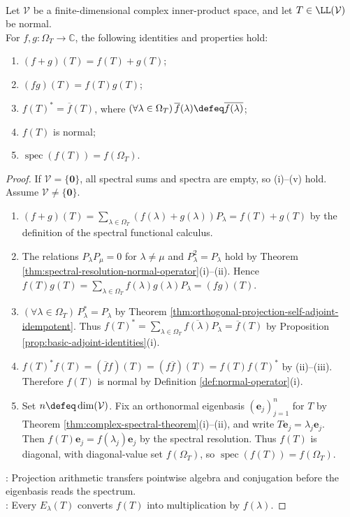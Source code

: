 \begin{theorem} \label{thm:normal-spectral-functional-calculus-rules} \\
Let $\mathcal{V}$ be a finite-dimensional complex inner-product space, and let $T\in\LL(\mathcal{V})$ be normal.\\
For $f,g:\Omega_T\to\mathbb{C}$, the following identities and properties hold:
\begin{enumerate}[label=(\roman*)]
\setlength{\itemsep}{0pt}
\item $(f+g)(T)=f(T)+g(T)$;
\item $(fg)(T)=f(T)g(T)$;
\item $f(T)^*=\overline{f}(T)$, where $(\forall\lambda\in\Omega_T)\,\overline{f}(\lambda)\defeq\overline{f(\lambda)}$;
\item $f(T)$ is normal;
\item $\operatorname{spec}(f(T))=f(\Omega_T)$.
\end{enumerate}
\begin{proof}
If $\mathcal{V}=\{\mathbf{0}\}$, all spectral sums and spectra are empty, so (i)--(v) hold. Assume $\mathcal{V}\neq\{\mathbf{0}\}$.
\begin{enumerate}[label=(\roman*)]
\setlength{\itemsep}{0pt}
\item $(f+g)(T)=\sum\limits_{\lambda\in\Omega_T}(f(\lambda)+g(\lambda))P_{\lambda}=f(T)+g(T)$ by the definition of the spectral functional calculus.
\item The relations $P_{\lambda}P_{\mu}=0$ for $\lambda\neq\mu$ and $P_{\lambda}^2=P_{\lambda}$ hold by Theorem \ref{thm:spectral-resolution-normal-operator}(i)--(ii). Hence $f(T)g(T)=\sum\limits_{\lambda\in\Omega_T}f(\lambda)g(\lambda)P_{\lambda}=(fg)(T)$.
\item $(\forall\lambda\in\Omega_T)\,P_{\lambda}^*=P_{\lambda}$ by Theorem \ref{thm:orthogonal-projection-self-adjoint-idempotent}. Thus $f(T)^*=\sum\limits_{\lambda\in\Omega_T}\overline{f(\lambda)}P_{\lambda}=\overline{f}(T)$ by Proposition \ref{prop:basic-adjoint-identities}(i).
\item $f(T)^*f(T)=(\overline{f}f)(T)=(f\overline{f})(T)=f(T)f(T)^*$ by (ii)--(iii). Therefore $f(T)$ is normal by Definition \ref{def:normal-operator}(i).
\item Set $n\defeq\dim(\mathcal{V})$. Fix an orthonormal eigenbasis $(\mathbf{e}_j)_{j=1}^{n}$ for $T$ by Theorem \ref{thm:complex-spectral-theorem}(i)--(ii), and write $T\mathbf{e}_j=\lambda_j\mathbf{e}_j$.\\
Then $f(T)\mathbf{e}_j=f(\lambda_j)\mathbf{e}_j$ by the spectral resolution. Thus $f(T)$ is diagonal, with diagonal-value set $f(\Omega_T)$, so $\operatorname{spec}(f(T))=f(\Omega_T)$.
\end{enumerate}
: Projection arithmetic transfers pointwise algebra and conjugation before the eigenbasis reads the spectrum.\\
: Every $E_{\lambda}(T)$ converts $f(T)$ into multiplication by $f(\lambda)$.
\end{proof}
\end{theorem}

